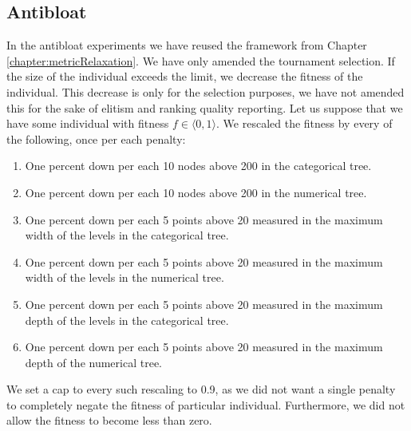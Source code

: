  \subsection{Antibloat}
 In the antibloat experiments we have reused the framework from Chapter \ref{chapter:metricRelaxation}. We have only amended the tournament selection. If the size of the individual exceeds the limit, we decrease the fitness of the individual. This decrease is only for the selection purposes, we have not amended this for the sake of elitism and ranking quality reporting. Let us suppose that we have some individual with fitness $f \in \langle 0,1 \rangle.$ We rescaled the fitness by every of the following, once per each penalty: 
 \begin{enumerate}
 	\item One percent down per each 10 nodes above 200 in the categorical tree.
 	\item One percent down per each 10 nodes above 200 in the numerical tree.
  	\item One percent down per each 5 points above 20 measured in the maximum width of the levels in the categorical tree.
 	\item One percent down per each 5 points above 20 measured in the maximum width of the levels in the numerical tree.
  	\item One percent down per each 5 points above 20 measured in the maximum depth of the levels in the categorical tree.
  	\item One percent down per each 5 points above 20 measured in the maximum depth of the numerical tree. 	
 \end{enumerate}  
We set a cap to every such rescaling to 0.9, as we did not want a single penalty to completely negate the fitness of particular individual.
Furthermore, we did not allow the fitness to become less than zero. 
 
